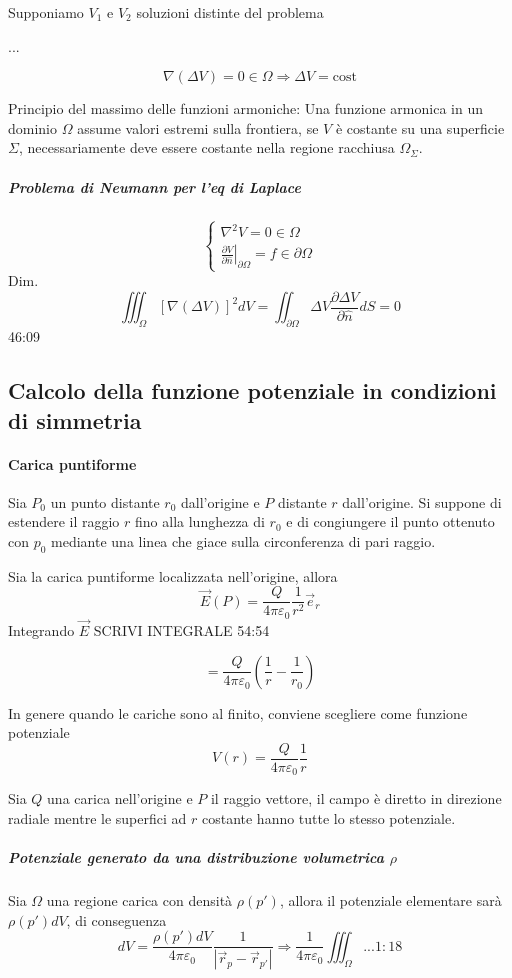 Supponiamo $V_1$ e $V_2$ soluzioni distinte del problema

...

$$
\nabla(\Delta V) = 0 \in \Omega \Rightarrow \Delta V = \text{cost}
$$

Principio del massimo delle funzioni armoniche:
Una funzione armonica in un dominio $\Omega$ assume valori estremi sulla frontiera, se $V$ è costante
su una superficie $\Sigma$, necessariamente deve essere costante nella regione racchiusa $\Omega_\Sigma$.


\subparagraph{Problema di Neumann per l'eq di Laplace}
$$
\begin{cases}
\nabla^2 V = 0 \in \Omega\\
\left.\frac{\partial V}{\partial\hat{n}}\right|_{\partial \Omega} = f \in \partial \Omega
\end{cases}
$$
Dim.
$$
\iiint_{\Omega} \left[\nabla(\Delta V)\right]^2 dV = \iint_{\partial\Omega} \Delta V \frac{\partial\Delta V}{\partial \hat{n}} dS = 0
$$
46:09

\subsection{Calcolo della funzione potenziale in condizioni di simmetria}
\paragraph{Carica puntiforme}
Sia $P_0$ un punto distante $r_0$ dall'origine e $P$ distante $r$ dall'origine.
Si suppone di estendere il raggio $r$ fino alla lunghezza di $r_0$ e di congiungere il punto
ottenuto con $p_0$ mediante una linea che giace sulla circonferenza di pari raggio.

Sia la carica puntiforme localizzata nell'origine, allora
$$
\vec{E}(P) = \frac{Q}{4\pi \varepsilon_0}\frac{1}{r^2} \vec{e}_r
$$
Integrando $\vec{E}$
SCRIVI INTEGRALE 54:54

$$
 = \frac{Q}{4\pi\varepsilon_0}\left(\frac{1}{r} - \frac{1}{r_0}\right)
$$


In genere quando le cariche sono al finito, conviene scegliere come funzione potenziale
$$
V(r) = \frac{Q}{4 \pi \varepsilon_0}\frac{1}{r}
$$

Sia $Q$ una carica nell'origine e $P$ il raggio vettore, il campo è diretto in direzione radiale
mentre le superfici ad $r$ costante hanno tutte lo stesso potenziale.

\subparagraph{Potenziale generato da una distribuzione volumetrica $\rho$}
Sia $\Omega$ una regione carica con densità $\rho(p')$, allora il potenziale elementare sarà
$\rho(p')dV$, di conseguenza
$$
dV = \frac{\rho(p')dV}{4\pi\varepsilon_0}\frac{1}{|\vec{r}_p - \vec{r}_{p'}|} \Rightarrow
\frac{1}{4\pi\varepsilon_0} \iiint_\Omega ... 1:18
$$

